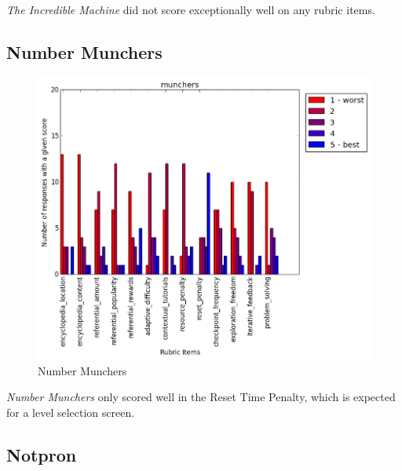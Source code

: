 				\textit{The Incredible Machine} did not score exceptionally well on any rubric items.

			\subsection{Number Munchers}

				\begin{figure}[] 
				\centering 
				\includegraphics[width=\textwidth, height=.4\textheight, keepaspectratio=true]{munchers_scores.png} 
				\caption{Number Munchers}
				\end{figure}

				\textit{Number Munchers} only scored well in the Reset Time Penalty, which is expected for a level selection screen.

			\subsection{Notpron}

